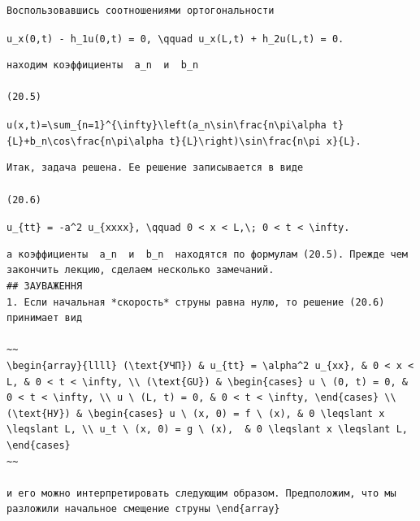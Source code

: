 \documentclass[
  ukrainian,
]{article}
\begin{document}
\begin{verbatim}
Воспользовавшись соотношениями ортогональности
\end{verbatim}

\texttt{u\_x(0,t)\ -\ h\_1u(0,t)\ =\ 0,\ \textbackslash{}qquad\ u\_x(L,t)\ +\ h\_2u(L,t)\ =\ 0.}

\begin{verbatim}
находим коэффициенты  a_n  и  b_n 

(20.5)
\end{verbatim}

\texttt{u(x,t)=\textbackslash{}sum\_\{n=1\}\^{}\{\textbackslash{}infty\}\textbackslash{}left(a\_n\textbackslash{}sin\textbackslash{}frac\{n\textbackslash{}pi\textbackslash{}alpha\ t\}\{L\}+b\_n\textbackslash{}cos\textbackslash{}frac\{n\textbackslash{}pi\textbackslash{}alpha\ t\}\{L\}\textbackslash{}right)\textbackslash{}sin\textbackslash{}frac\{n\textbackslash{}pi\ x\}\{L\}.}

\begin{verbatim}
Итак, задача решена. Ее решение записывается в виде

(20.6)
\end{verbatim}

\texttt{u\_\{tt\}\ =\ -a\^{}2\ u\_\{xxxx\},\ \textbackslash{}qquad\ 0\ \textless{}\ x\ \textless{}\ L,\textbackslash{};\ 0\ \textless{}\ t\ \textless{}\ \textbackslash{}infty.}

\begin{verbatim}
а коэффициенты  a_n  и  b_n  находятся по формулам (20.5). Прежде чем закончить лекцию, сделаем несколько замечаний.
## ЗАУВАЖЕННЯ
1. Если начальная *скорость* струны равна нулю, то решение (20.6) принимает вид

~~
\begin{array}{llll} (\text{УЧП}) & u_{tt} = \alpha^2 u_{xx}, & 0 < x < L, & 0 < t < \infty, \\ (\text{GU}) & \begin{cases} u \ (0, t) = 0, & 0 < t < \infty, \\ u \ (L, t) = 0, & 0 < t < \infty, \end{cases} \\ (\text{НУ}) & \begin{cases} u \ (x, 0) = f \ (x), & 0 \leqslant x \leqslant L, \\ u_t \ (x, 0) = g \ (x),  & 0 \leqslant x \leqslant L, \end{cases}
~~

и его можно интерпретировать следующим образом. Предположим, что мы разложили начальное смещение струны \end{array}
\end{verbatim}
\end{document}
